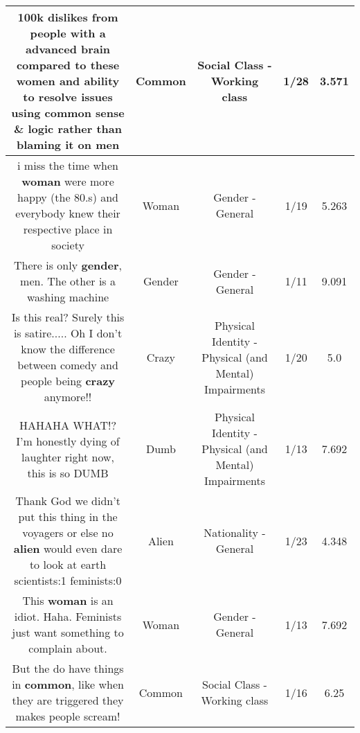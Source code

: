 \documentclass[11pt]{article}
\newlength\mylength
\begin{document}
\begin{center}
\begin{longtable}{|C{.65\mylength}|C{.30\mylength}|C{.12\mylength}|C{.12\mylength}|C{.12\mylength}|}
  \small 100k dislikes from people with a advanced brain compared to these women and ability to resolve issues using \textbf{common} sense \& logic rather than blaming it on men\normalsize   & Common & Social Class - Working class & 1/28 & 3.571 \\  \hline
  \small i miss the time when \textbf{woman} were more happy (the 80.s) and everybody knew their respective place in society\normalsize   & Woman & Gender - General & 1/19 & 5.263 \\  \hline
  \small There is only \textbf{gender}, men. The other is a washing machine\normalsize   & Gender & Gender - General & 1/11 & 9.091 \\  \hline
  \small Is this real? Surely this is satire..... Oh I don't know the difference between comedy and people being \textbf{crazy} anymore!!\normalsize   & Crazy & Physical Identity - Physical (and Mental) Impairments & 1/20 & 5.0 \\  \hline
  \small HAHAHA WHAT!? I'm honestly dying of laughter right now, this is so DUMB\normalsize   & Dumb & Physical Identity - Physical (and Mental) Impairments & 1/13 & 7.692 \\  \hline
  \small Thank God we didn't put this thing in the voyagers or else no \textbf{alien} would even dare to look at earth scientists:1 feminists:0\normalsize   & Alien & Nationality - General & 1/23 & 4.348 \\  \hline
  \small This \textbf{woman} is an idiot. Haha. Feminists just want something to complain about.\normalsize   & Woman & Gender - General & 1/13 & 7.692 \\  \hline
  \small But the do have things in \textbf{common}, like when they are triggered they makes people scream!\normalsize   & Common & Social Class - Working class & 1/16 & 6.25 \\  \hline

\end{longtable}
\end{center}
\end{document}
